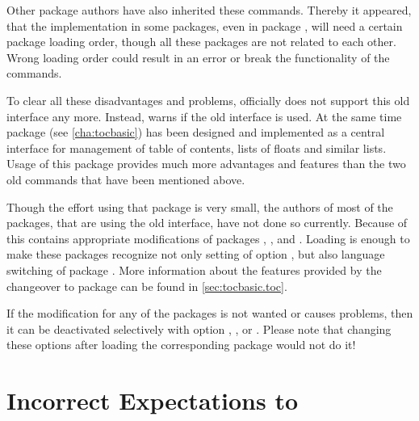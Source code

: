 Other package authors have also inherited these commands. Thereby it appeared,
that the implementation in some packages, even in package ,
will need a certain package loading order, though all these packages are not
related to each other. Wrong loading order could result in an error or break the
functionality of the commands.

To clear all these disadvantages and problems, \KOMAScript{} officially does not
support this old interface any more. Instead, \KOMAScript{} warns if the old
interface is used. At the same time package
 (see
\autoref{cha:tocbasic}) has been designed and implemented as a central
interface for management of table of contents, lists of floats and similar
lists. Usage of this package provides much more advantages and features than
the two old commands that have been mentioned above.

Though the effort using that package is very small, the authors of most of the
packages, that are using the old interface, have not done so
currently. Because of this  contains appropriate
modifications of packages
,
, and
. Loading  is enough
to make these packages recognize not only setting of \KOMAScript{} option
, but also
language switching of package . More
information about the features provided by the changeover to package
 can be found in \autoref{sec:tocbasic.toc}.

If the modification for any of the packages is not wanted or causes problems,
then it can be deactivated selectively with option
,
,
or
.
Please note that changing these options after loading the
corresponding package would not do it!


\section{Incorrect Expectations to }

